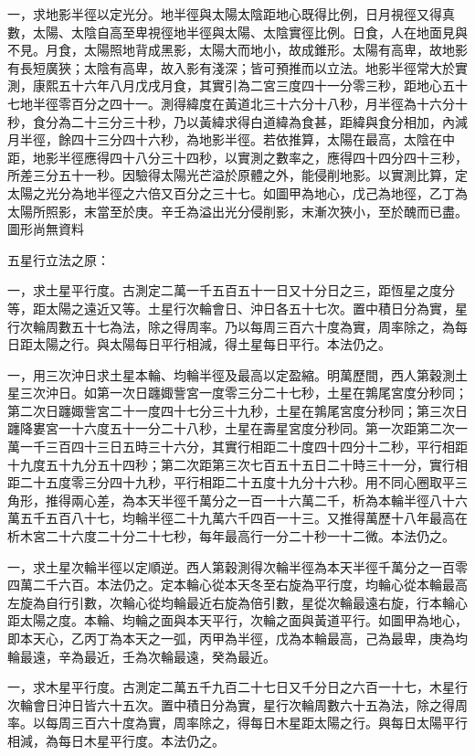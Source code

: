 \begin{pinyinscope}
一，求地影半徑以定光分。地半徑與太陽太陰距地心既得比例，日月視徑又得真數，太陽、太陰自高至卑視徑地半徑與太陽、太陰實徑比例。日食，人在地面見與不見。月食，太陽照地背成黑影，太陽大而地小，故成錐形。太陽有高卑，故地影有長短廣狹；太陰有高卑，故入影有淺深；皆可預推而以立法。地影半徑常大於實測，康熙五十六年八月戊戌月食，其實引為二宮三度四十一分零三秒，距地心五十七地半徑零百分之四十一。測得緯度在黃道北三十六分十八秒，月半徑為十六分十秒，食分為二十三分三十秒，乃以黃緯求得白道緯為食甚，距緯與食分相加，內減月半徑，餘四十三分四十六秒，為地影半徑。若依推算，太陽在最高，太陰在中距，地影半徑應得四十八分三十四秒，以實測之數率之，應得四十四分四十三秒，所差三分五十一秒。因驗得太陽光芒溢於原體之外，能侵削地影。以實測比算，定太陽之光分為地半徑之六倍又百分之三十七。如圖甲為地心，戊己為地徑，乙丁為太陽所照影，末當至於庚。辛壬為溢出光分侵削影，末漸次狹小，至於醜而已盡。圖形尚無資料

五星行立法之原：

一，求土星平行度。古測定二萬一千五百五十一日又十分日之三，距恆星之度分等，距太陽之遠近又等。土星行次輪會日、沖日各五十七次。置中積日分為實，星行次輪周數五十七為法，除之得周率。乃以每周三百六十度為實，周率除之，為每日距太陽之行。與太陽每日平行相減，得土星每日平行。本法仍之。

一，用三次沖日求土星本輪、均輪半徑及最高以定盈縮。明萬歷間，西人第穀測土星三次沖日。如第一次日躔娵訾宮一度零三分二十七秒，土星在鶉尾宮度分秒同；第二次日躔娵訾宮二十一度四十七分三十九秒，土星在鶉尾宮度分秒同；第三次日躔降婁宮一十六度五十一分二十八秒，土星在壽星宮度分秒同。第一次距第二次一萬一千三百四十三日五時三十六分，其實行相距二十度四十四分十二秒，平行相距十九度五十九分五十四秒；第二次距第三次七百五十五日二十時三十一分，實行相距二十五度零三分四十九秒，平行相距二十五度十九分十六秒。用不同心圈取平三角形，推得兩心差，為本天半徑千萬分之一百一十六萬二千，析為本輪半徑八十六萬五千五百八十七，均輪半徑二十九萬六千四百一十三。又推得萬歷十八年最高在析木宮二十六度二十分二十七秒，每年最高行一分二十秒一十二微。本法仍之。

一，求土星次輪半徑以定順逆。西人第穀測得次輪半徑為本天半徑千萬分之一百零四萬二千六百。本法仍之。定本輪心從本天冬至右旋為平行度，均輪心從本輪最高左旋為自行引數，次輪心從均輪最近右旋為倍引數，星從次輪最遠右旋，行本輪心距太陽之度。本輪、均輪之面與本天平行，次輪之面與黃道平行。如圖甲為地心，即本天心，乙丙丁為本天之一弧，丙甲為半徑，戊為本輪最高，己為最卑，庚為均輪最遠，辛為最近，壬為次輪最遠，癸為最近。

一，求木星平行度。古測定二萬五千九百二十七日又千分日之六百一十七，木星行次輪會日沖日皆六十五次。置中積日分為實，星行次輪周數六十五為法，除之得周率。以每周三百六十度為實，周率除之，得每日木星距太陽之行。與每日太陽平行相減，為每日木星平行度。本法仍之。


\end{pinyinscope}
